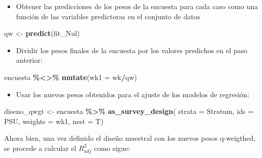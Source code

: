 \documentclass[
  12pt,
]{book}
\newenvironment{Shaded}{\begin{snugshade}}{\end{snugshade}}
\newcommand{\AttributeTok}[1]{\textcolor[rgb]{0.13,0.29,0.53}{#1}}
\newcommand{\DecValTok}[1]{\textcolor[rgb]{0.00,0.00,0.81}{#1}}
\newcommand{\FunctionTok}[1]{\textcolor[rgb]{0.13,0.29,0.53}{\textbf{#1}}}
\newcommand{\NormalTok}[1]{#1}
\newcommand{\OtherTok}[1]{\textcolor[rgb]{0.56,0.35,0.01}{#1}}
\newcommand{\SpecialCharTok}[1]{\textcolor[rgb]{0.81,0.36,0.00}{\textbf{#1}}}
\providecommand{\tightlist}{%
  \setlength{\itemsep}{0pt}\setlength{\parskip}{0pt}}
\begin{document}
\begin{itemize}
\tightlist
\item
  Obtener las predicciones de los pesos de la encuesta para cada caso como una función de las variables predictoras en el conjunto de datos
\end{itemize}

\begin{Shaded}
\begin{Highlighting}[]
\NormalTok{qw }\OtherTok{\textless{}{-}} \FunctionTok{predict}\NormalTok{(fit\_Nul)}
\end{Highlighting}
\end{Shaded}

\begin{itemize}
\tightlist
\item
  Dividir los pesos finales de la encuesta por los valores predichos en el paso anterior:
\end{itemize}

\begin{Shaded}
\begin{Highlighting}[]
\NormalTok{encuesta }\SpecialCharTok{\%\textless{}\textgreater{}\%} \FunctionTok{mutate}\NormalTok{(}\AttributeTok{wk1 =}\NormalTok{ wk}\SpecialCharTok{/}\NormalTok{qw)}
\end{Highlighting}
\end{Shaded}

\begin{itemize}
\tightlist
\item
  Usar los nuevos pesos obtenidos para el ajuste de los modelos de regresión:
\end{itemize}

\begin{Shaded}
\begin{Highlighting}[]
\NormalTok{diseno\_qwgt }\OtherTok{\textless{}{-}}\NormalTok{ encuesta }\SpecialCharTok{\%\textgreater{}\%}
  \FunctionTok{as\_survey\_design}\NormalTok{(}
    \AttributeTok{strata =}\NormalTok{ Stratum,}
    \AttributeTok{ids =}\NormalTok{ PSU,}
    \AttributeTok{weights =}\NormalTok{ wk1,}
    \AttributeTok{nest =}\NormalTok{ T)}
\end{Highlighting}
\end{Shaded}

Ahora bien, una vez definido el diseño muestral con los nuevos pesos q-weigthed, se procede a calcular el \(R_{adj}^{2}\) como sigue:

\begin{Shaded}
\end{Shaded}
\end{document}
